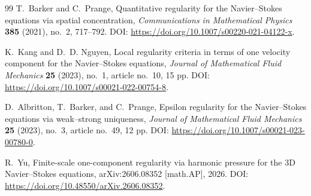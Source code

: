 \documentclass[11pt]{article}
\numberwithin{equation}{section}
\theoremstyle{plain}
\theoremstyle{definition}
\theoremstyle{remark}
\begin{document}
\begin{thebibliography}{99}
T.~Barker and C.~Prange,
\newblock Quantitative regularity for the Navier--Stokes equations via spatial concentration,
\newblock \emph{Communications in Mathematical Physics} \textbf{385} (2021), no.~2, 717--792.
\newblock DOI: \url{https://doi.org/10.1007/s00220-021-04122-x}.

K.~Kang and D.~D. Nguyen,
\newblock Local regularity criteria in terms of one velocity component for the Navier--Stokes equations,
\newblock \emph{Journal of Mathematical Fluid Mechanics} \textbf{25} (2023), no.~1, article no.~10, 15 pp.
\newblock DOI: \url{https://doi.org/10.1007/s00021-022-00754-8}.

D.~Albritton, T.~Barker, and C.~Prange,
\newblock Epsilon regularity for the Navier--Stokes equations via weak--strong uniqueness,
\newblock \emph{Journal of Mathematical Fluid Mechanics} \textbf{25} (2023), no.~3, article no.~49, 12 pp.
\newblock DOI: \url{https://doi.org/10.1007/s00021-023-00780-0}.

R.~Yu,
\newblock Finite-scale one-component regularity via harmonic pressure for the 3D Navier--Stokes equations,
\newblock arXiv:2606.08352 [math.AP], 2026.
\newblock DOI: \url{https://doi.org/10.48550/arXiv.2606.08352}.

\end{thebibliography}
\end{document}
